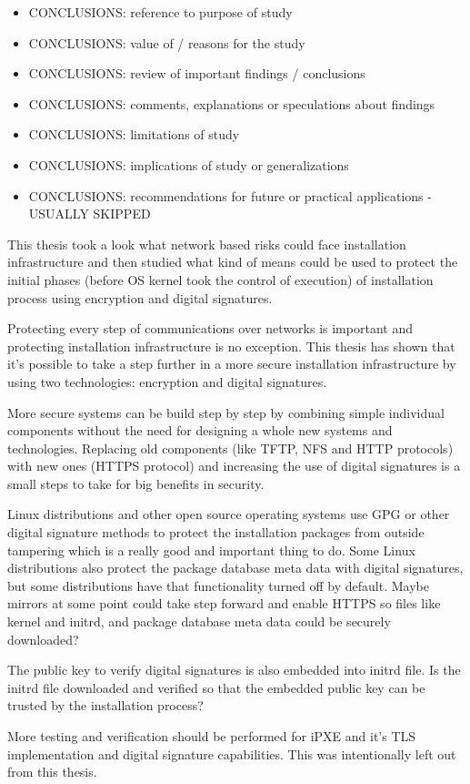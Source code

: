 
\begin{itemize}
\item CONCLUSIONS: reference to purpose of study
\item CONCLUSIONS: value of / reasons for the study
\item CONCLUSIONS: review of important findings / conclusions
\item CONCLUSIONS: comments, explanations or speculations about findings
\item CONCLUSIONS: limitations of study
\item CONCLUSIONS: implications of study or generalizations
\item CONCLUSIONS: recommendations for future or practical applications - USUALLY SKIPPED
\end{itemize}

This thesis took a look what network based risks could face
installation infrastructure and then studied what kind of means could
be used to protect the initial phases (before OS kernel took the
control of execution) of installation process using encryption and
digital signatures.

Protecting every step of communications over networks is important and
protecting installation infrastructure is no exception. This thesis
has shown that it's possible to take a step further in a more secure
installation infrastructure by using two technologies: encryption and
digital signatures.

More secure systems can be build step by step by combining simple
individual components without the need for designing a whole new
systems and technologies. Replacing old components (like TFTP, NFS
and HTTP protocols) with new ones (HTTPS protocol) and increasing the
use of digital signatures is a small steps to take for big benefits in
security.

Linux distributions and other open source operating systems use GPG or
other digital signature methods to protect the installation packages from
outside tampering which is a really good and important thing to
do. Some Linux distributions also protect the package database
meta data with digital signatures, but some distributions have that
functionality turned off by default. Maybe mirrors at some point could
take step forward and enable HTTPS so files like kernel and initrd,
and package database meta data could be securely downloaded?

The public key to verify digital signatures is also embedded into initrd
file. Is the initrd file downloaded and verified so that the embedded
public key can be trusted by the installation process?

More testing and verification should be performed for iPXE and it's
TLS implementation and digital signature capabilities. This was
intentionally left out from this thesis.
